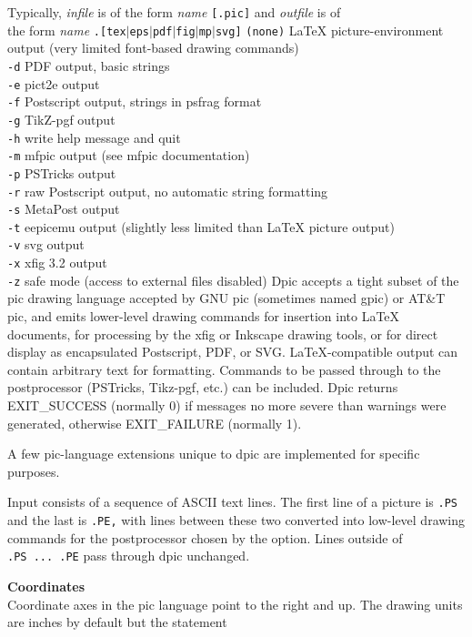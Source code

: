 Typically,
{\it infile}
is of the form
{\it name}
{\tt [.pic]}
and
{\it outfile}
is of
\\\hbox{}\hskip-1pt
the form
{\it name}
{\tt .[tex$|$eps$|$pdf$|$fig$|$mp$|$svg]}
{\tt (none)}
LaTeX picture-environment output (very limited font-based drawing commands)
\\\hbox{}\hskip-1pt
{\tt -d}
PDF output, basic strings
\\\hbox{}\hskip-1pt
{\tt -e}
pict2e output
\\\hbox{}\hskip-1pt
{\tt -f}
Postscript output, strings in psfrag format
\\\hbox{}\hskip-1pt
{\tt -g}
TikZ-pgf output
\\\hbox{}\hskip-1pt
{\tt -h}
write help message and quit
\\\hbox{}\hskip-1pt
{\tt -m}
mfpic output (see mfpic documentation)
\\\hbox{}\hskip-1pt
{\tt -p}
PSTricks output
\\\hbox{}\hskip-1pt
{\tt -r}
raw Postscript output, no automatic string formatting
\\\hbox{}\hskip-1pt
{\tt -s}
MetaPost output
\\\hbox{}\hskip-1pt
{\tt -t}
eepicemu output (slightly less limited than LaTeX picture output)
\\\hbox{}\hskip-1pt
{\tt -v}
svg output
\\\hbox{}\hskip-1pt
{\tt -x}
xfig 3.2 output
\\\hbox{}\hskip-1pt
{\tt -z}
safe mode (access to external files disabled)
%
Dpic accepts a tight subset of the pic drawing language accepted by
GNU pic (sometimes named gpic) or AT\&T pic, and emits lower-level
drawing commands for insertion into LaTeX documents, for processing by
the xfig or Inkscape drawing tools, or for direct display as encapsulated
Postscript, PDF, or SVG. LaTeX-compatible output can contain arbitrary
text for formatting.  Commands to be passed through to the postprocessor
(PSTricks, Tikz-pgf, etc.)  can be included.  Dpic returns EXIT\_SUCCESS
(normally 0) if messages no more severe than warnings were generated,
otherwise EXIT\_FAILURE (normally 1).

A few pic-language extensions unique to dpic
are implemented for specific purposes.

Input consists of a sequence of ASCII text lines.
The first line of a picture is
{\tt .PS}
and the last is
{\tt .PE,}
with lines between
these two converted into low-level drawing commands for the postprocessor
chosen by the option.
Lines outside of
{\tt .PS\ ...\ .PE}
pass through dpic unchanged.
\par\hskip-2pc{\bf Coordinates}\\
Coordinate axes in the pic
language point to the right and up.
The drawing units are inches by default but the statement

